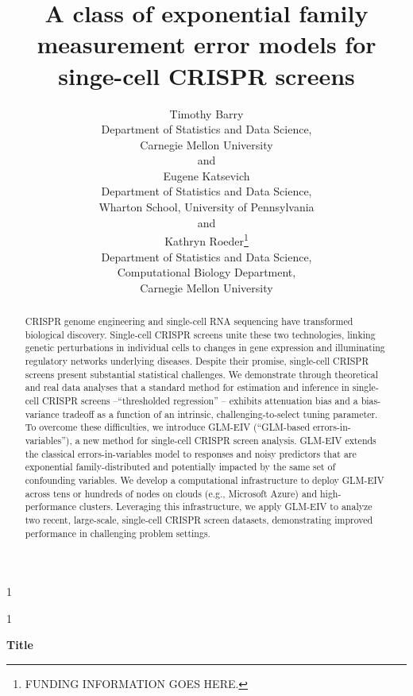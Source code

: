 \documentclass[12pt]{article}
\newcommand{\blind}{1}
\begin{document}
	
\def\spacingset#1{\renewcommand{\baselinestretch}%
{#1}\small\normalsize} \spacingset{1}
\blind
{
	\title{\bf A class of exponential family measurement error models for singe-cell CRISPR screens}
	\author{Timothy Barry\\
		Department of Statistics and Data Science,\\Carnegie Mellon University\\
		and\\
		Eugene Katsevich\\
		Department of Statistics and Data Science,\\Wharton School, University of Pennsylvania\\
		and\\
		Kathryn Roeder\thanks{ FUNDING INFORMATION GOES HERE.}\hspace{.2cm}\\
		Department of Statistics and Data Science,\\Computational Biology Department,\\ 
		Carnegie Mellon University}
	\maketitle
} \fi

\blind
{
	\bigskip
	\bigskip
	\bigskip
	\begin{center}
		{\LARGE\bf Title}
	\end{center}
	\medskip
} \fi

\bigskip
\begin{abstract}
CRISPR genome engineering and single-cell RNA sequencing have transformed biological discovery. Single-cell CRISPR screens unite these two technologies, linking genetic perturbations in individual cells to changes in gene expression and illuminating regulatory networks underlying diseases. Despite their promise, single-cell CRISPR screens present substantial statistical challenges. We demonstrate through theoretical and real data analyses that a standard method for estimation and inference in single-cell CRISPR screens --``thresholded regression'' -- exhibits attenuation bias and a bias-variance tradeoff as a function of an intrinsic, challenging-to-select tuning parameter. To overcome these difficulties, we introduce GLM-EIV (``GLM-based errors-in-variables''), a new method for single-cell CRISPR screen analysis. GLM-EIV extends the classical errors-in-variables model to responses and noisy predictors that are exponential family-distributed and potentially impacted by the same set of confounding variables. We develop a computational infrastructure to deploy GLM-EIV across tens or hundreds of nodes on clouds (e.g., Microsoft Azure) and high-performance clusters. Leveraging this infrastructure, we apply GLM-EIV to analyze two recent, large-scale, single-cell CRISPR screen datasets, demonstrating improved performance in challenging problem settings.
\end{abstract}
\end{document}
